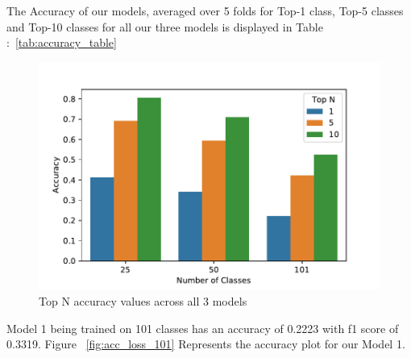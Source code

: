 \documentclass[conference]{IEEEtran}
\begin{document}
\FloatBarrier
The Accuracy of our models, averaged over 5 folds for Top-1 class, Top-5 classes and Top-10 classes for all our three models is displayed in Table :~\ref{tab:accuracy_table}
\FloatBarrier
\begin{table}[!htbp]
\caption{Accuracy of our models, averaged over 5 folds}
\label{tab:accuracy_table}
\end{table}

\FloatBarrier
\begin{figure}[!htbp]
\centerline
{\includegraphics[width=\columnwidth]{images/accuracies.pdf}}
\caption{Top N accuracy values across all 3 models}
\label{fig:accuracies_barchart}
\end{figure}

\FloatBarrier
Model 1 being trained on 101 classes has an accuracy of 0.2223 with f1 score of 0.3319. 
Figure ~\ref{fig:acc_loss_101} Represents the accuracy plot for our Model 1.
 
\end{document}
